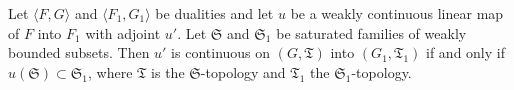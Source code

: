 Let $\langle F, G \rangle$ and $\langle F_1, G_1 \rangle$ be dualities and let $u$ be a weakly continuous linear map of $F$ into $F_1$ with adjoint $u'$. Let $\mathfrak{S}$ and $\mathfrak{S}_1$ be saturated families of weakly bounded subsets. Then $u'$ is continuous on $(G, \mathfrak{T})$ into $(G_1, \mathfrak{T}_1)$ if and only if $u(\mathfrak{S}) \subset \mathfrak{S}_1$, where $\mathfrak{T}$ is the $\mathfrak{S}$-topology and $\mathfrak{T}_1$ the $\mathfrak{S}_1$-topology.
